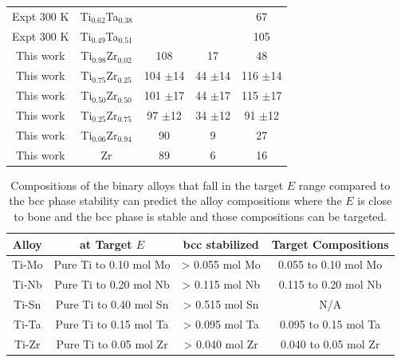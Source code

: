 \begin{longtable}[H]{ c c c c c}
	Expt 300 K \cite{Zhou2004a} & Ti$_{0.62}$Ta$_{0.38}$ & & & 67\\
	Expt 300 K \cite{Zhou2004a} & Ti$_{0.49}$Ta$_{0.51}$ & & & 105\\
	This work & Ti$_{0.98}$Zr$_{0.02}$ & 108 & 17 & 48\\
	This work & Ti$_{0.75}$Zr$_{0.25}$ & 104 $\pm$14 & 44 $\pm$14 & 116 $\pm$14\\
	This work & Ti$_{0.50}$Zr$_{0.50}$ & 101 $\pm$17 & 44 $\pm$17 & 115 $\pm$17\\
	This work & Ti$_{0.25}$Zr$_{0.75}$ & 97 $\pm$12 & 34 $\pm$12 & 91 $\pm$12\\
	This work & Ti$_{0.06}$Zr$_{0.94}$ & 90 & 9 & 27\\
	This work & Zr & 89 & 6 & 16\\
	\hline
\end{longtable}

\newpage
\begin{table}[H]
	\caption{Compositions of the binary alloys that fall in the target $E$ range compared to the bcc phase stability can predict the alloy compositions where the $E$ is close to bone and the bcc phase is stable and those compositions can be targeted.}
	\centering
	\begin{tabular}{ c c c c }
		\hline
		Alloy & at Target $E$ & bcc stabilized & Target Compositions\\
		\hline
		Ti-Mo & Pure Ti to 0.10 mol Mo & > 0.055 mol Mo & 0.055 to 0.10 mol Mo\\
		Ti-Nb & Pure Ti to 0.20 mol Nb & > 0.115 mol Nb & 0.115 to 0.20 mol Nb\\		
		Ti-Sn & Pure Ti to 0.40 mol Sn & > 0.515 mol Sn & N/A\\		
		Ti-Ta & Pure Ti to 0.15 mol Ta & > 0.095 mol Ta & 0.095 to 0.15 mol Ta\\
		Ti-Zr & Pure Ti to 0.05 mol Zr & > 0.040 mol Zr & 0.040 to 0.05 mol Zr\\		
		\hline
	\end{tabular}
	\label{Ch5-table:targetalloys}
\end{table}
\clearpage

